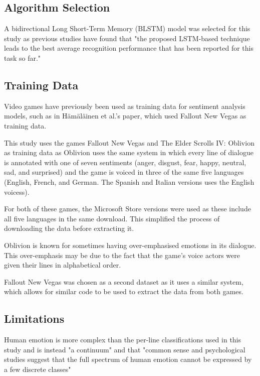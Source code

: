 \documentclass[journal]{IEEEtran}
\begin{document}
\subsection{Algorithm Selection}
A bidirectional Long Short-Term Memory (BLSTM) model was selected for this study as previous studies
have found that "the proposed LSTM-based technique leads to the best average recognition performance
that has been reported for this task so far." \cite{wollmer_lstm-modeling_2013}

\subsection{Training Data}
Video games have previously been used as training data for sentiment analysis models, such as in
Hämäläinen et al.'s paper, \cite{hamalainen_video_2022} which used Fallout New Vegas as training data.

This study uses the games Fallout New Vegas \cite{noauthor_buy_nodate} and
The Elder Scrolls IV: Oblivion \cite{noauthor_elder_nodate} as training data as
Oblivion uses the same system in which every line of dialogue is annotated with one of seven sentiments
(anger, disgust, fear, happy, neutral, sad, and surprised) and the game is voiced in three of the same five languages
(English, French, and German. The Spanish and Italian versions uses the English voicess).

For both of these games, the Microsoft Store versions were used as these include all five languages
in the same download. This simplified the process of downloading the data before extracting it.

Oblivion is known for sometimes having over-emphasised emotions in its dialogue.
This over-emphasis may be due to the fact that the game's voice actors were given their lines
in alphabetical order. \cite[1:00]{noclip_-_video_game_documentaries_music_2018}

Fallout New Vegas was chosen as a second dataset as it uses a similar system, which
allows for similar code to be used to extract the data from both games.

\subsection{Limitations}
Human emotion is more complex than the per-line classifications used in this study and is instead
"a continuum" and that "common sense and psychological studies suggest that the full spectrum of
human emotion cannot be expressed by a few discrete classes" \cite{wollmer_abandoning_2008}
\end{document}
